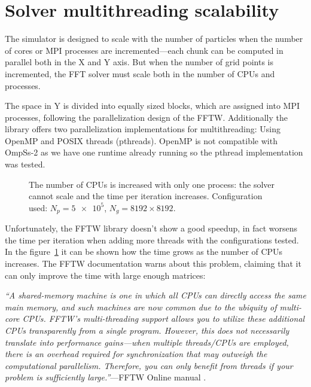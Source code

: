 \section{Solver multithreading scalability}

The simulator is designed to scale with the number of particles when the number 
of cores or MPI processes are incremented---each chunk can be computed in 
parallel both in the X and Y axis. But when the number of grid points is 
incremented, the FFT solver must scale both in the number of CPUs and processes.  

The space in Y is divided into equally sized blocks, which are assigned into MPI 
processes, following the parallelization design of the FFTW. Additionally the 
library offers two parallelization implementations for multithreading: Using 
OpenMP and POSIX threads (pthreads).  OpenMP is not compatible with OmpSs-2 as 
we have one runtime already running so the pthread implementation was tested.
%
\begin{figure}[h]%
	\centering
	\caption{The number of CPUs is increased with only one process: the solver 
	cannot scale and the time per iteration increases. Configuration used: $N_p = 
	\num{5e5}$, $N_g=8192\times8192$.}
	\label{fig:fftw-time}
\end{figure}%
%
Unfortunately, the FFTW library doesn't show a good speedup, in fact worsens the 
time per iteration when adding more threads with the configurations tested. In 
the figure~\ref{fig:fftw-time} it can be shown how the time grows as the number 
of CPUs increases.
%
The FFTW documentation warns about this problem, claiming that it can only 
improve the time with large enough matrices:
%
\begin{displayquote}
{\sl ``A shared-memory machine is one in which all CPUs can directly access the 
same main memory, and such machines are now common due to the ubiquity of 
multi-core CPUs. FFTW’s multi-threading support allows you to utilize these 
additional CPUs transparently from a single program. However, this does not 
necessarily translate into performance gains---when multiple threads/CPUs are 
employed, there is an overhead required for synchronization that may outweigh 
the computational parallelism. Therefore, you can only benefit from threads if 
your problem is sufficiently large.''}---FFTW Online manual \cite{FFTW-manual}.
\end{displayquote}
